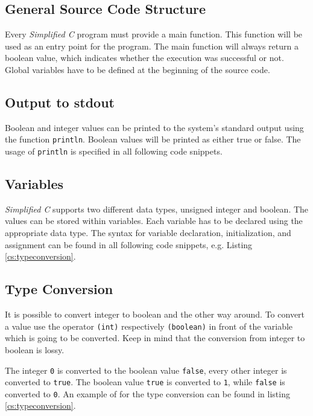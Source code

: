 \documentclass[12pt,a4paper,titlepage,oneside,final]{article}
\begin{document}
\subsection{General Source Code Structure}
\label{subsec:sourcecodestructure}
Every \emph{Simplified C} program must provide a main function. This function will be used as an entry point for the program. The main function will always return a boolean value, which indicates whether the execution was successful or not. Global variables have to be defined at the beginning of the source code.

\subsection{Output to stdout}
Boolean and integer values can be printed to the system's standard output using the function \texttt{println}. Boolean values will be printed as either true or false. The usage of \texttt{println} is specified in all following code snippets.

\subsection{Variables}
\emph{Simplified C} supports two different data types, unsigned integer and boolean. The values can be stored within variables. Each variable has to be declared using the appropriate data type. The syntax for variable declaration, initialization, and assignment can be found in all following code snippets, e.g. Listing \vref{cs:typeconversion}.

\subsection{Type Conversion}
It is possible to convert integer to boolean and the other way around. To convert a value use the operator \texttt{(int)} respectively \texttt{(boolean)} in front of the variable which is going to be converted. Keep in mind that the conversion from integer to boolean is lossy. 

The integer \texttt{0} is converted to the boolean value \texttt{false}, every other integer is converted to \texttt{true}. The boolean value \texttt{true} is converted to \texttt{1}, while \texttt{false} is converted to \texttt{0}.
An example of for the type conversion can be found in listing \vref{cs:typeconversion}.

\end{document}
